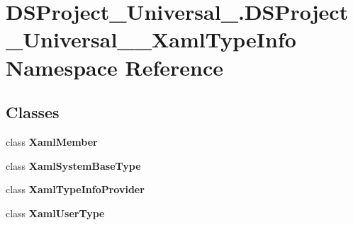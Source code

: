 \section{D\+S\+Project\+\_\+\+Universal\+\_\+.\+D\+S\+Project\+\_\+\+Universal\+\_\+\+\_\+\+Xaml\+Type\+Info Namespace Reference}
\label{namespace_d_s_project___universal___1_1_d_s_project___universal_____xaml_type_info}
\subsection*{Classes}
\begin{DoxyCompactItemize}
\item 
class {\bfseries Xaml\+Member}
\item 
class {\bfseries Xaml\+System\+Base\+Type}
\item 
class {\bfseries Xaml\+Type\+Info\+Provider}
\item 
class {\bfseries Xaml\+User\+Type}
\end{DoxyCompactItemize}
